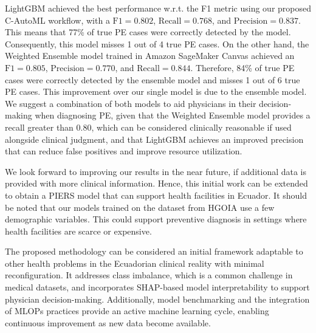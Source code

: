 \documentclass[diagnostics,article,submit,pdftex,moreauthors]{Definitions/mdpi}
\begin{document}
LightGBM achieved the best performance \ac{w.r.t.} the
\ac{F1} metric using our proposed \ac{C-AutoML} workflow, with a
$\mathrm{F1}=0.802$, $\mathrm{Recall}=0.768$, and
$\mathrm{Precision}=0.837$. This means that 77\% of true \ac{PE}
cases were correctly detected by the model. Consequently, this model
misses 1 out of 4 true \ac{PE} cases. On the other hand, the
Weighted Ensemble model trained in Amazon SageMaker Canvas achieved an
$\mathrm{F1}=0.805$, $\mathrm{Precision}=0.770$, and
$\mathrm{Recall}=0.844$. Therefore, 84\% of true \ac{PE} cases
were correctly detected by the ensemble model and misses 1 out of 6
true \ac{PE} cases. This improvement over our single model is due
to the ensemble model. We suggest a combination of both models
to aid physicians in their decision-making when diagnosing \ac{PE},
given that the Weighted Ensemble model provides a
recall greater than 0.80, which can be considered clinically
reasonable if used alongside clinical judgment, and that
LightGBM achieves an improved precision that can reduce false
positives and improve resource utilization. 

We look forward to improving our results in the near future, if
additional data is provided with more clinical information. Hence,
this initial work can be extended to obtain a \ac{PIERS} model that
can support health facilities in Ecuador. It should be noted that our
models trained on the dataset from \ac{HGOIA} use a few
demographic variables. This could support preventive diagnosis in
settings where health facilities are scarce or expensive.

The proposed methodology can be considered an initial framework
adaptable to other health problems in the Ecuadorian clinical reality
with minimal reconfiguration. It addresses class imbalance, which is
a common challenge in medical datasets, and incorporates
\ac{SHAP}-based model interpretability to support physician
decision-making. Additionally, model benchmarking and the integration
of \ac{MLOPs} practices provide an active machine learning cycle,
enabling continuous improvement as new data become available.

\end{document}
